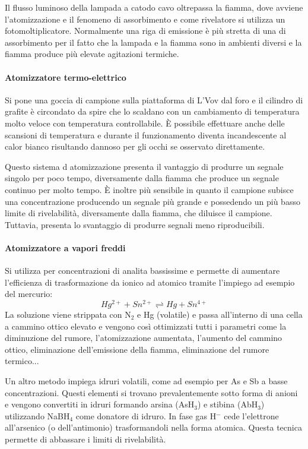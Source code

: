 Il flusso luminoso della lampada a catodo cavo oltrepassa la fiamma, dove avviene l'atomizzazione e il fenomeno di assorbimento e come rivelatore si utilizza un fotomoltiplicatore.
Normalmente una riga di emissione è più stretta di una di assorbimento per il fatto che la lampada e la fiamma sono in ambienti diversi e la fiamma produce più elevate agitazioni termiche.

\paragraph{Atomizzatore termo-elettrico}
Si pone una goccia di campione sulla piattaforma di L’Vov dal foro e il cilindro di grafite è circondato da spire che lo scaldano con un cambiamento di temperatura molto veloce con temperatura controllabile.
È possibile effettuare anche delle scansioni di temperatura e durante il funzionamento diventa incandescente al calor bianco risultando dannoso per gli occhi se osservato direttamente.


Questo sistema d atomizzazione presenta il vantaggio di produrre un segnale singolo per poco tempo, diversamente dalla fiamma che produce un segnale continuo per molto tempo.
È inoltre più sensibile in quanto il campione subisce una concentrazione producendo un segnale più grande e possedendo un più basso limite di rivelabilità, diversamente dalla fiamma, che diluisce il campione.
Tuttavia, presenta lo svantaggio di produrre segnali meno riproducibili.

\paragraph{Atomizzatore a vapori freddi}
Si utilizza per concentrazioni di analita bassissime e permette di aumentare l'efficienza di trasformazione da ionico ad atomico tramite l'impiego ad esempio del mercurio:
\[
Hg^{2+} + Sn^{2+} \rightleftharpoons Hg + Sn^{4+} 
\]
La soluzione viene strippata con N$_2$ e Hg (volatile) e passa all'interno di una cella a cammino ottico elevato e vengono così ottimizzati tutti i parametri come la diminuzione del rumore, l'atomizzazione aumentata,
l'aumento del cammino ottico, eliminazione dell'emissione della fiamma, eliminazione del rumore termico...

Un altro metodo impiega idruri volatili, come ad esempio per As e Sb a basse concentrazioni.
Questi elementi si trovano prevalentemente sotto forma di anioni e vengono convertiti in idruri formando arsina (AsH$_3$) e stibina (AbH$_3$) utilizzando NaBH$_4$ come donatore di idruro.
In fase gas H$^-$ cede l'elettrone all'arsenico (o dell'antimonio) trasformandoli nella forma atomica.
Questa tecnica permette di abbassare i limiti di rivelabilità.

